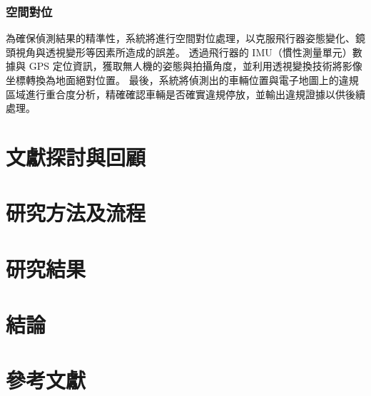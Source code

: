 \documentclass[12pt]{article}       %
\begin{document}
\subsubsection{空間對位}
\hspace{2em}為確保偵測結果的精準性，系統將進行空間對位處理，以克服飛行器姿態變化、鏡頭視角與透視變形等因素所造成的誤差。
透過飛行器的 IMU（慣性測量單元）數據與 GPS 定位資訊，獲取無人機的姿態與拍攝角度，並利用透視變換技術將影像坐標轉換為地面絕對位置。
最後，系統將偵測出的車輛位置與電子地圖上的違規區域進行重合度分析，精確確認車輛是否確實違規停放，並輸出違規證據以供後續處理。

\section{\centering 文獻探討與回顧}
\hspace{2em}




\section{\centering 研究方法及流程}
\hspace{2em}




\section{\centering 研究結果}





\section{\centering 結論} 




\section{\centering 參考文獻}
\vspace{-3.5em}  %
\renewcommand{\refname}{}  %
\printbibliography  %
\end{document}
